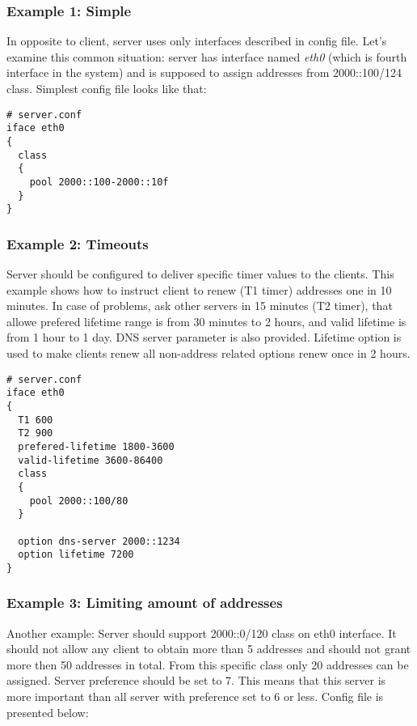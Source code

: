 \subsubsection{Example 1: Simple}

In opposite to client, server uses only interfaces described in config
file. Let's examine this common situation: server has interface
named \emph{eth0} (which is fourth interface in the system) and is
supposed to assign addresses from 2000::100/124 class. Simplest config
file looks like that:

\begin{lstlisting}
# server.conf
iface eth0
{ 
  class
  {
    pool 2000::100-2000::10f
  } 
}
\end{lstlisting}

\subsubsection{Example 2: Timeouts}
Server should be configured to deliver specific timer values to the
clients. This example shows how to instruct client to renew (T1 timer) 
addresses one in 10 minutes. In case of problems, ask other servers in
15 minutes (T2 timer), that allowe prefered lifetime range is from 30
minutes to 2 hours, and valid lifetime is from 1 hour to 1 day. DNS
server parameter is also provided. Lifetime option is used to make
clients renew all non-address related options renew once in 2 hours.

\begin{lstlisting}
# server.conf
iface eth0 
{
  T1 600
  T2 900
  prefered-lifetime 1800-3600
  valid-lifetime 3600-86400
  class
  {
    pool 2000::100/80
  } 

  option dns-server 2000::1234
  option lifetime 7200
}
\end{lstlisting}

\subsubsection{Example 3: Limiting amount of addresses}
Another example: Server should support 2000::0/120 class on eth0
interface. It should not allow any client to obtain more than 5
addresses and should not grant more then 50 addresses in total. From
this specific class only 20 addresses can be assigned. Server
preference should be set to 7. This means that this server is more
important than all server with preference set to 6 or less. 
Config file is presented below:

